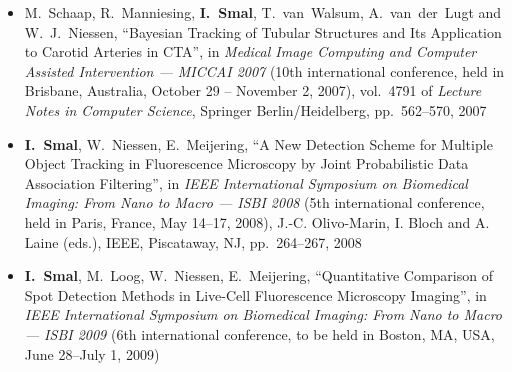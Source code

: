 \begin{itemize}
\item M.~Schaap, R.~Manniesing, \textbf{I.~Smal}, T.~van~Walsum, A.~van~der~Lugt and W.~J.~Niessen,
``Bayesian Tracking of Tubular Structures and Its Application to Carotid Arteries in CTA'', 
in \emph{Medical Image Computing and Computer Assisted Intervention
  --- MICCAI 2007} (10th international conference, held in Brisbane,
Australia, October 29 -- November 2, 2007), vol.~4791 of \emph{Lecture
  Notes in Computer Science}, Springer Berlin/Heidelberg, pp.~562--570,
2007


\item \textbf{I.~Smal}, W.~Niessen, E.~Meijering, ``A New Detection
  Scheme for Multiple Object Tracking in Fluorescence Microscopy by
  Joint Probabilistic Data Association Filtering'', in \emph{IEEE
    International Symposium on Biomedical Imaging: From Nano to Macro --- ISBI 2008}
  (5th international conference, held in Paris, France, May 14--17,
  2008), J.-C. Olivo-Marin, I. Bloch and A. Laine (eds.), IEEE, 
  Piscataway, NJ, pp.~264--267, 2008

\item \textbf{I.~Smal}, M.~Loog, W.~Niessen, E.~Meijering,
  ``Quantitative Comparison of Spot Detection Methods in Live-Cell
  Fluorescence Microscopy Imaging'', in \emph{IEEE 
    International Symposium on Biomedical Imaging: From Nano to Macro --- ISBI 2009}
  (6th international conference, to be held in Boston, MA, USA, June
  28--July 1, 2009)

\end{itemize}

\normalsize


